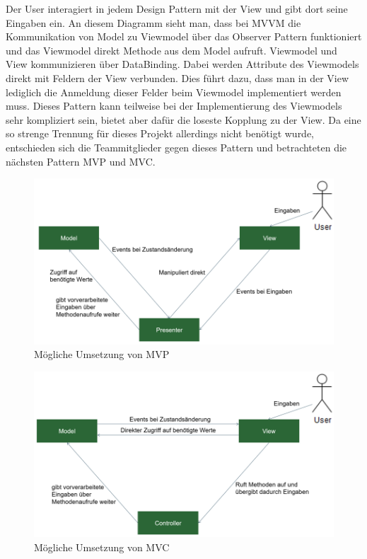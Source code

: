 
Der User interagiert in jedem Design Pattern mit der View und gibt dort seine Eingaben ein. An diesem Diagramm sieht man, dass bei MVVM die Kommunikation von Model zu Viewmodel über das Observer Pattern funktioniert und das Viewmodel direkt Methode aus dem Model aufruft. Viewmodel und View kommunizieren über DataBinding. Dabei werden Attribute des Viewmodels direkt mit Feldern der View verbunden. Dies führt dazu, dass man in der View lediglich die Anmeldung dieser Felder beim Viewmodel implementiert werden muss. Dieses Pattern kann teilweise bei der Implementierung des Viewmodels sehr kompliziert sein, bietet aber dafür die loseste Kopplung zu der View. Da eine so strenge Trennung für dieses Projekt allerdings nicht benötigt wurde, entschieden sich die Teammitglieder gegen dieses Pattern und betrachteten die nächsten Pattern MVP und MVC. 


\begin{figure}[!h]
	\includegraphics[width=1\columnwidth]{img/design-pattern-moeglich-mvp}
	\caption[Mögliche Umsetzung von MVP]{Mögliche Umsetzung von MVP\footnotemark}
\end{figure}

\begin{figure}[!h]
	\includegraphics[width=1\columnwidth]{img/design-pattern-moeglich-mvc}
	\caption[Mögliche Umsetzung von MVC]{Mögliche Umsetzung von MVC\footnotemark}
\end{figure}

